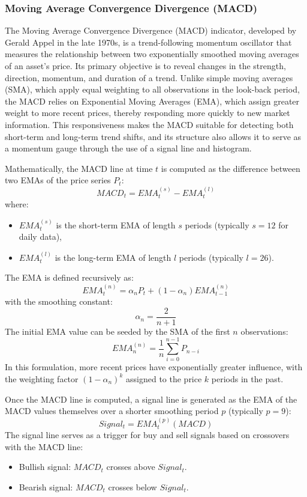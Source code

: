 \subsubsection{Moving Average Convergence Divergence (MACD)}

The Moving Average Convergence Divergence (MACD) indicator, developed by Gerald Appel in the late 1970s, is a trend-following momentum oscillator that measures the relationship between two exponentially smoothed moving averages of an asset’s price. Its primary objective is to reveal changes in the strength, direction, momentum, and duration of a trend. Unlike simple moving averages (SMA), which apply equal weighting to all observations in the look-back period, the MACD relies on Exponential Moving Averages (EMA), which assign greater weight to more recent prices, thereby responding more quickly to new market information. This responsiveness makes the MACD suitable for detecting both short-term and long-term trend shifts, and its structure also allows it to serve as a momentum gauge through the use of a signal line and histogram.

Mathematically, the MACD line at time $t$ is computed as the difference between two EMAs of the price series $P_t$:
\[
MACD_t = EMA_{t}^{(s)} - EMA_{t}^{(l)}
\]
where:
\begin{itemize}
    \item $EMA_{t}^{(s)}$ is the short-term EMA of length $s$ periods (typically $s=12$ for daily data),
    \item $EMA_{t}^{(l)}$ is the long-term EMA of length $l$ periods (typically $l=26$).
\end{itemize}
The EMA is defined recursively as:
\[
EMA_t^{(n)} = \alpha_n P_t + (1 - \alpha_n) EMA_{t-1}^{(n)}
\]
with the smoothing constant:
\[
\alpha_n = \frac{2}{n+1}
\]
The initial EMA value can be seeded by the SMA of the first $n$ observations:
\[
EMA_{n}^{(n)} = \frac{1}{n} \sum_{i=0}^{n-1} P_{n-i}
\]
In this formulation, more recent prices have exponentially greater influence, with the weighting factor $(1-\alpha_n)^k$ assigned to the price $k$ periods in the past.

Once the MACD line is computed, a signal line is generated as the EMA of the MACD values themselves over a shorter smoothing period $p$ (typically $p=9$):
\[
Signal_t = EMA_{t}^{(p)}(MACD)
\]
The signal line serves as a trigger for buy and sell signals based on crossovers with the MACD line:
\begin{itemize}
    \item Bullish signal: $MACD_t$ crosses above $Signal_t$.
    \item Bearish signal: $MACD_t$ crosses below $Signal_t$.
\end{itemize}

